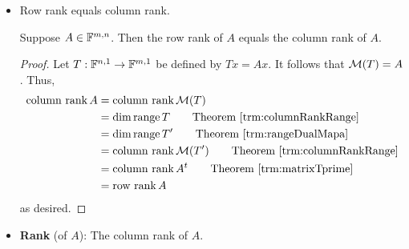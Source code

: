 \documentclass[../main.tex]{subfiles}
\begin{document}
\begin{itemize}
\begin{theorem}
\begin{proof}
\begin{align*}
                &= \dim\spn(\mat{Tv_1},\dots,\mat{Tv_n})
            \end{align*}
            where the latter value is the column rank, as desired.
        \end{proof}
    \end{theorem}
    \item Row rank equals column rank.
    \begin{theorem}
        Suppose $A\in\mathbb{F}^{m,n}$. Then the row rank of $A$ equals the column rank of $A$.
        \begin{proof}
            Let $T:\mathbb{F}^{n,1}\to\mathbb{F}^{m,1}$ be defined by $Tx=Ax$. It follows that $\mathcal{M}(T)=A$. Thus,
            \begin{align*}
                \text{column rank}\,A &= \text{column rank}\,\mat{T}\\
                &= \dim\range T\tag*{Theorem \ref{trm:columnRankRange}}\\
                &= \dim\range T'\tag*{Theorem \ref{trm:rangeDualMapa}}\\
                &= \text{column rank}\,\mat{T'}\tag*{Theorem \ref{trm:columnRankRange}}\\
                &= \text{column rank}\,A^t\tag*{Theorem \ref{trm:matrixTprime}}\\
                &= \text{row rank}\,A
            \end{align*}
            as desired.
        \end{proof}
    \end{theorem}
    \item \textbf{Rank} (of $A$): The column rank of $A$.
\end{itemize}
\end{document}
